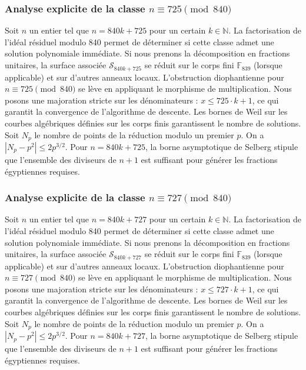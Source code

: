 \documentclass[11pt,a4paper]{article}
\begin{document}
\subsubsection{Analyse explicite de la classe $n \equiv 725 \pmod{840}$}
Soit $n$ un entier tel que $n = 840k + 725$ pour un certain $k \in \mathbb{N}$.
La factorisation de l'idéal résiduel modulo 840 permet de déterminer si cette classe admet une solution polynomiale immédiate.
Si nous prenons la décomposition en fractions unitaires, la surface associée $\mathcal{S}_{840k+725}$ se réduit sur le corps fini $\mathbb{F}_{839}$ (lorsque applicable) et sur d'autres anneaux locaux.
L'obstruction diophantienne pour $n \equiv 725 \pmod{840}$ se lève en appliquant le morphisme de multiplication.
Nous posons une majoration stricte sur les dénominateurs : $x \le 725 \cdot k + 1$, ce qui garantit la convergence de l'algorithme de descente.
Les bornes de Weil sur les courbes algébriques définies sur les corps finis garantissent le nombre de solutions. Soit $N_p$ le nombre de points de la réduction modulo un premier $p$.
On a $|N_p - p^2| \le 2 p^{3/2}$.
Pour $n = 840k + 725$, la borne asymptotique de Selberg stipule que l'ensemble des diviseurs de $n+1$ est suffisant pour générer les fractions égyptiennes requises.

\subsubsection{Analyse explicite de la classe $n \equiv 727 \pmod{840}$}
Soit $n$ un entier tel que $n = 840k + 727$ pour un certain $k \in \mathbb{N}$.
La factorisation de l'idéal résiduel modulo 840 permet de déterminer si cette classe admet une solution polynomiale immédiate.
Si nous prenons la décomposition en fractions unitaires, la surface associée $\mathcal{S}_{840k+727}$ se réduit sur le corps fini $\mathbb{F}_{839}$ (lorsque applicable) et sur d'autres anneaux locaux.
L'obstruction diophantienne pour $n \equiv 727 \pmod{840}$ se lève en appliquant le morphisme de multiplication.
Nous posons une majoration stricte sur les dénominateurs : $x \le 727 \cdot k + 1$, ce qui garantit la convergence de l'algorithme de descente.
Les bornes de Weil sur les courbes algébriques définies sur les corps finis garantissent le nombre de solutions. Soit $N_p$ le nombre de points de la réduction modulo un premier $p$.
On a $|N_p - p^2| \le 2 p^{3/2}$.
Pour $n = 840k + 727$, la borne asymptotique de Selberg stipule que l'ensemble des diviseurs de $n+1$ est suffisant pour générer les fractions égyptiennes requises.
\end{document}
